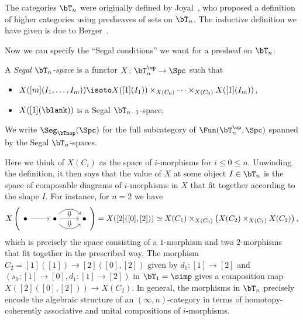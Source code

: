 \documentclass[a4paper,12pt]{article}
\begin{document}
\begin{remark}
  The categories $\bT_{n}$ were originally defined by
  Joyal~\cite{JoyalTheta}, who proposed a definition of higher
  categories using presheaves of sets on $\bT_{n}$. The inductive
  definition we have given is due to Berger~\cite{BergerWreath}.
\end{remark}

Now we can specify the ``Segal conditions'' we want for a presheaf on $\bT_{n}$:
\begin{defn}
  A \emph{Segal $\bT_{n}$-space} is a functor $X \colon \bT_{n}^{\op}
  \to \Spc$  such that
  \begin{itemize}
  \item $X([m](I_{1},\ldots,I_{m})) \isoto X([1](I_{1}))\times_{X(C_{0})}
    \cdots \times_{X(C_{0})} X([1](I_{m}))$,
  \item $X([1](\blank))$ is a Segal $\bT_{n-1}$-space.
  \end{itemize}
  We write $\Seg_{\bTnop}(\Spc)$ for the full subcategory of
  $\Fun(\bT_{n}^{\op}, \Spc)$ spanned by the Segal $\bT_{n}$-spaces.
\end{defn}

\begin{remark}
Here we think of $X(C_{i})$ as the space of $i$-morphisms for $i \leq
0 \leq n$. Unwinding the definition, it then says that the value of
$X$ at some object $I \in \bT_{n}$ is the space of composable diagrams
of $i$-morphisms in $X$ that fit together according to the shape
$I$. For instance, for $n = 2$ we have
\[ X\left(
  \begin{tikzcd}
  \bullet 
  \ar[r]  &
  \bullet 
  \ar[r, bend left=50, ""{below,name=G,inner sep=1pt}] 
  \ar[r, ""{name=H1,inner sep=1pt}, ""{name=H2,below,inner sep=1pt}] 
  \ar[r, bend right=50, ""{name=I,inner sep=1pt}] &
  \bullet
  \arrow[from=G,to=H1,Rightarrow]
  \arrow[from=H2,to=I,Rightarrow]
  \end{tikzcd}
\right) = X([2]([0],[2])) \simeq X(C_{1}) \times_{X(C_{0})}
\left(X(C_{2}) \times_{X(C_{1})} X(C_{2})\right),\] which is precisely
the space consisting of a $1$-morphism and two $2$-morphisms that fit
together in the prescribed way. The morphism $C_{2}= [1]([1]) \to
[2]([0],[2])$ given by $d_{1} \colon [1] \to [2]$ and $(s_{0} \colon
[1] \to [0], d_{1} \colon [1] \to [2])$ in $\bT_{1} = \simp$ gives a
composition map $X([2]([0],[2])) \to X(C_{2})$. In general, the
morphisms in $\bT_{n}$ precisely encode the algebraic structure of an
$(\infty,n)$-category in terms of homotopy-coherently associative and
unital compositions of $i$-morphisms.
\end{remark}
\end{document}
